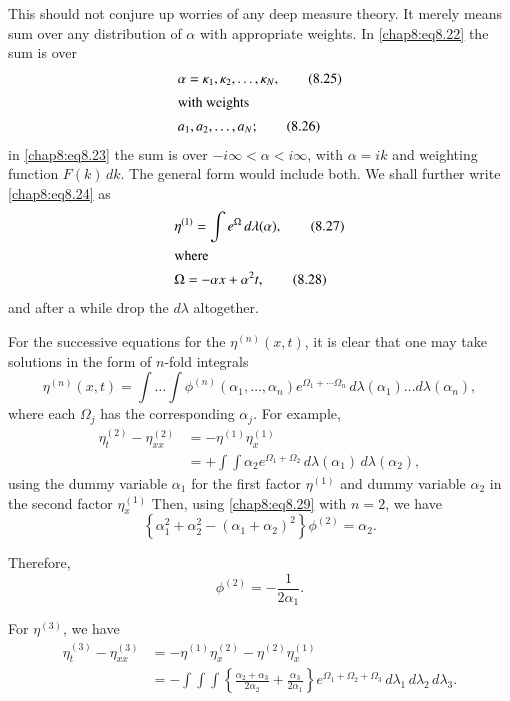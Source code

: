 This should not conjure up worries of any deep measure theory. It merely means sum over any distribution of $\alpha$ with appropriate weights. In \eqref{chap8:eq8.22} the sum is over 
\begin{align}
& \alpha =\kappa_1,\kappa_2,\ldots,\kappa_N,\tag{8.25}\label{chap8:eq8.25}\\
\intertext{with weights}
& a_1,a_2,\ldots,a_N;\tag{8.26}\label{chap8:eq8.26}
\end{align}\pageoriginale
in \eqref{chap8:eq8.23} the sum is over $-i\infty <\alpha < i\infty$, with $\alpha =ik$ and weighting function $F(k)\,dk$. The general form would include both. We shall further write \eqref{chap8:eq8.24} as 
\begin{align}
& \eta^{(1)}=\int e^\Omega\,d\lambda(\alpha),\tag{8.27}\label{chap8:eq8.27}\\
\intertext{where}
& \Omega = -\alpha x+\alpha^2 t,\tag{8.28}\label{chap8:eq8.28}
\end{align}
and after a while drop the $d\lambda$ altogether.

For the successive equations for the $\eta^{(n)}(x,t)$, it is clear that one may take solutions in the form of $n$-fold integrals 
\begin{equation}
\eta^{(n)}(x,t)=\int\ldots\int\phi^{(n)}\left(\alpha_1,\ldots,\alpha_n\right) e^{\Omega_1+\cdots\Omega_n}\,d\lambda(\alpha_1)\ldots d\lambda(\alpha_n), \tag{8.29}\label{chap8:eq8.29}
\end{equation}
where each $\Omega_j$ has the corresponding $\alpha_j$. For example, 
\begin{align*}
\eta_t^{(2)}-\eta_{xx}^{(2)} &= -\eta^{(1)}\eta_x^{(1)}\\
& = +\int\int\alpha_2 e^{\Omega_1+\Omega_2}\,d\lambda(\alpha_1)\,d\lambda (\alpha_2),
\end{align*}
using the dummy variable $\alpha_1$ for the first factor $\eta^{(1)}$ and dummy variable $\alpha_2$ in the second factor $\eta_x^{(1)}$ Then, using \eqref{chap8:eq8.29} with $n=2$, we have 
\begin{equation}
\left\{\alpha_1^2+\alpha_2^2-\left(\alpha_1+\alpha_2\right)^2\right\}\phi^{(2)} =\alpha_2.\tag{8.31}\label{chap8:eq8.31}
\end{equation}

Therefore,\pageoriginale
\begin{equation}
\phi^{(2)}=-\frac{1}{2\alpha_1}.\tag{8.32}\label{chap8:eq8.32}
\end{equation}

For $\eta^{(3)}$, we have 
\begin{align*}
\eta_t^{(3)}-\eta_{xx}^{(3)} &= -\eta^{(1)}\eta_x^{(2)}-\eta^{(2)}\eta_x^{(1)}\\
&= -\int\int\int\left\{\frac{\alpha_2+\alpha_3}{2\alpha_2}+\frac{\alpha_3}{2\alpha_1}\right\}e^{\Omega_1+\Omega_2+\Omega_3}\,d\lambda_1\,d\lambda_2\,d\lambda_3. \tag{8.33}\label{chap8:eq8.33}
\end{align*}

